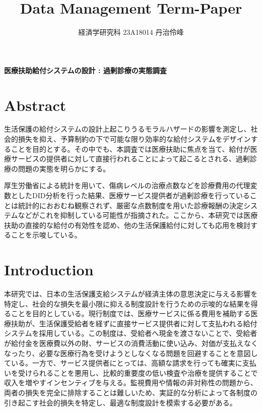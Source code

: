 \documentclass{jsarticle}
\begin{document}
\title{Data Management Term-Paper}
\author{経済学研究科 23A18014 丹治伶峰}
\date{}
\maketitle

\Large

\textbf{医療扶助給付システムの設計 : 過剰診療の実態調査}

\large

\section{Abstract}

生活保護の給付システムの設計上起こりうるモラルハザードの影響を測定し、社会的損失を抑え、予算制約の下で可能な限り効率的な給付システムをデザインすることを目的とする。その中でも、本調査では医療扶助に焦点を当て、給付が医療サービスの提供者に対して直接行われることによって起こるとされる、過剰診療の問題の実態を明らかにする。

厚生労働省による統計を用いて、傷病レベルの治療点数などを診療費用の代理変数としたDID分析を行った結果、医療サービス提供者が過剰診療を行っていることは統計的におおむね観察されず、厳密な点数制度を用いた診療報酬の決定システムなどがこれを抑制している可能性が指摘された。ここから、本研究では医療扶助の直接的な給付の有効性を認め、他の生活保護給付に対しても応用を検討することを示唆している。

\section{Introduction}

本研究では、日本の生活保護支給システムが経済主体の意思決定に与える影響を特定し、社会的な損失を最小限に抑える制度設計を行うための示唆的な結果を得ることを目的としている。現行制度では、医療サービスに係る費用を補助する医療扶助が、生活保護受給者を経ずに直接サービス提供者に対して支払われる給付システムを採用している。この制度は、受給者へ現金を渡さないことで、受給者が給付金を医療費以外の財、サービスの消費活動に使い込み、対価が支払えなくなったり、必要な医療行為を受けようとしなくなる問題を回避することを意図している。一方で、サービス提供者にとっては、高額な請求を行っても確実に支払いを受けられることを悪用し、比較的重要度の低い検査や治療を提供することで収入を増やすインセンティブを与える。監視費用や情報の非対称性の問題から、両者の損失を完全に排除することは難しいため、実証的な分析によって各制度の引き起こす社会的損失を特定し、最適な制度設計を模索する必要がある。
\end{document}
